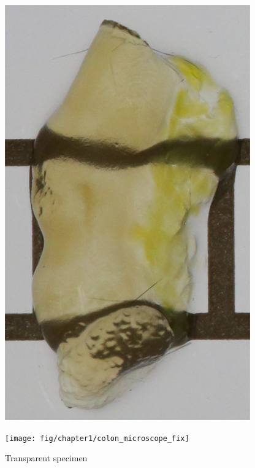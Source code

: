 \begin{figure}[H]
	\centering
	\begin{minipage}[b]{0.4\columnwidth}
		\centering
		\includegraphics[clip, angle=90, width=\linewidth]{fig/chapter1/colon_lucid}
	\end{minipage}
	\hspace{5truemm}
	\begin{minipage}[b]{0.4\columnwidth}
		\centering
		\texttt{[image: fig/chapter1/colon\_microscope\_fix]}
	\end{minipage}
	\caption{Transparent specimen}
	\label{fig:lucid}
\end{figure}


